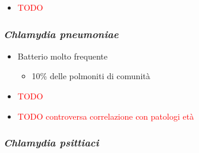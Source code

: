 \documentclass[italian,]{article}
\providecommand{\tightlist}{%
  \setlength{\itemsep}{0pt}\setlength{\parskip}{0pt}}
\newcommand{\TODO}[1]{\textcolor{red}{\textsf{\footnotesize{TODO #1}}}} %
\begin{document}
\begin{itemize}
\item
  \TODO{}
\end{itemize}

\hypertarget{chlamydia-pneumoniae}{%
\subsubsection{\texorpdfstring{\emph{Chlamydia
pneumoniae}}{Chlamydia pneumoniae}}\label{chlamydia-pneumoniae}}

\begin{itemize}
\item
  Batterio molto frequente

  \begin{itemize}
  \tightlist
  \item
    10\% delle polmoniti di comunità
  \end{itemize}
\item
  \TODO{}
\item
  \TODO{controversa correlazione con patologi età}
\end{itemize}

\hypertarget{chlamydia-psittiaci}{%
\subsubsection{\texorpdfstring{\emph{Chlamydia
psittiaci}}{Chlamydia psittiaci}}\label{chlamydia-psittiaci}}
\end{document}

